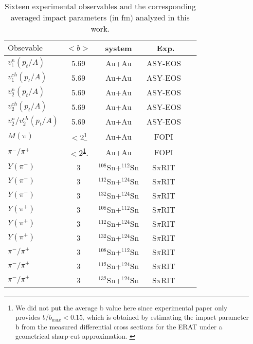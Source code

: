 \documentclass[reprint,aps,prc,twocolumn,superscriptaddress]{revtex4-1}
\begin{document}
\begin{table}[htbp]%
\caption{\label{tab:observable}%
Sixteen experimental observables and the corresponding averaged impact parameters (in fm) analyzed in this work.}
\begin{tabular}{lcccc}
\hline
\hline
$\text{Obsevable}$ &  $<b>$ & system & Exp.\\
\hline
$v^n_1(p_t/A)$ & 5.69 & Au+Au & ASY-EOS~\cite{Russotto2016PRC} \\
$v^{ch}_1(p_t/A)$ &  5.69 & Au+Au & ASY-EOS~\cite{Russotto2016PRC}\\
$v^{n}_2(p_t/A)$ &  5.69  & Au+Au & ASY-EOS~\cite{Russotto2016PRC}\\
$v^{ch}_2(p_t/A)$ &  5.69  & Au+Au & ASY-EOS~\cite{Russotto2016PRC}\\
$v_2^n/v_2^{ch}(p_t/A)$ &  5.69 & Au+Au & ASY-EOS~\cite{Russotto2016PRC}\\
$M(\pi)$ &  $<$2\footnote{We did not put the average b value here since experimental paper only provides $b/b_{max}<0.15$, which is obtained by estimating the impact parameter b from the measured differential cross sections for the
ERAT under a geometrical sharp-cut approximation. \label{1}}  & Au+Au & FOPI~\cite{FOPI2010}\\
$\pi^-/\pi^+$ &  $<$2\textsuperscript{\ref {1}}.  & Au+Au & FOPI~\cite{FOPI2010}\\
$Y(\pi^-)$ &  3  & $^{108}$Sn+$^{112}$Sn & S$\pi$RIT~\cite{GJhang20}\\
$Y(\pi^-)$ &  3  & $^{112}$Sn+$^{124}$Sn & S$\pi$RIT~\cite{GJhang20}\\
$Y(\pi^-)$ &  3  & $^{132}$Sn+$^{124}$Sn & S$\pi$RIT~\cite{GJhang20}\\
$Y(\pi^+)$ &  3  & $^{108}$Sn+$^{112}$Sn & S$\pi$RIT~\cite{GJhang20}\\
$Y(\pi^+)$ &  3  & $^{112}$Sn+$^{124}$Sn & S$\pi$RIT~\cite{GJhang20}\\
$Y(\pi^+)$ &  3  & $^{132}$Sn+$^{124}$Sn & S$\pi$RIT~\cite{GJhang20}\\
$\pi^-/\pi^+$ &  3  & $^{108}$Sn+$^{112}$Sn & S$\pi$RIT~\cite{GJhang20}\\
$\pi^-/\pi^+$ &  3  & $^{112}$Sn+$^{124}$Sn & S$\pi$RIT~\cite{GJhang20}\\
$\pi^-/\pi^+$ &  3  & $^{132}$Sn+$^{124}$Sn & S$\pi$RIT~\cite{GJhang20}\\
\hline
\hline
\end{tabular}
\end{table}
\end{document}
